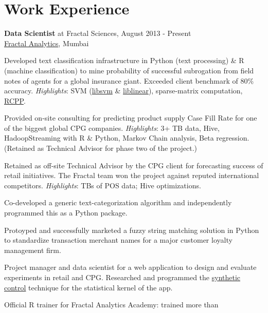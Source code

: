 \documentclass[a4paper,10pt]{article}
\renewenvironment{itemize}{
\begin{list}{}{
  \setlength{\leftmargin}{1.5em}
  }
  }{
\end{list}
}
\begin{document}
\section*{Work Experience}
\small{
\begin{itemize}
  \item \textbf{Data Scientist} at Fractal Sciences, August 2013 - Present \\
    \href{http://fractalanalytics.com}{Fractal Analytics}, Mumbai
    \begin{itemize}
      \item Developed text classification infrastructure in Python (text
        processing) \& R (machine classification) to mine probability of
        successful subrogation from field notes of agents for a global
        insurance giant. Exceeded client benchmark of 80\% accuracy.
        \emph{Highlights}: SVM
        (\href{http://www.csie.ntu.edu.tw/~cjlin/libsvm/}{libsvm} \&
        \href{http://www.csie.ntu.edu.tw/~cjlin/liblinear/}{liblinear}),
        sparse-matrix computation,
        \href{http://cran.r-project.org/web/packages/Rcpp/index.html}{RCPP}.
      \item Provided on-site consulting for predicting product supply Case Fill
        Rate for one of the biggest global CPG companies. \emph{Highlights}: 3+
        TB data, Hive, HadoopStreaming with R \& Python, Markov Chain analysis,
        Beta regression. (Retained as Technical Advisor for phase two of the
        project.)
      \item Retained as off-site Technical Advisor by the CPG client for
        forecasting success of retail initiatives. The Fractal team won the
        project against reputed international competitors. \emph{Highlights}:
        TBs of POS data; Hive optimizations.
      \item Co-developed a generic text-categorization algorithm and
        independently programmed this as a Python package.
      \item Protoyped and successfully marketed a fuzzy string matching
        solution in Python to standardize transaction merchant names for a
        major customer loyalty management firm.
      \item Project manager and data scientist for a web application to design
        and evaluate experiments in retail and CPG. Researched and programmed
        the \href{www.hks.harvard.edu/fs/aabadie/ccsp.pdf}{synthetic control}
        technique for the statistical kernel of the app.
      \item Official R trainer for Fractal Analytics Academy: trained more than

\end{itemize}
\end{itemize}}
\end{document}
